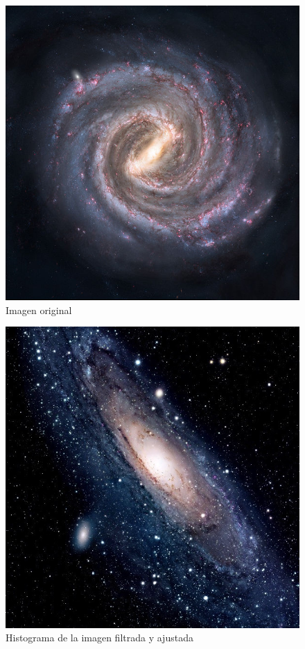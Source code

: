 \documentclass[10pt,journal,compsoc]{IEEEtran}\usepackage[T1]{fontenc}                              %
\begin{document}
\begin{figure}[!h]
	\caption{Imagen original}
	\centering
	\includegraphics*[scale=0.2]{im3}
	\centering
\end{figure}


\begin{figure}[!h]
	\caption{Histograma de la imagen filtrada y ajustada}
	\centering
	\includegraphics*[scale=0.2]{im4}
	\centering
\end{figure}
\end{document}
